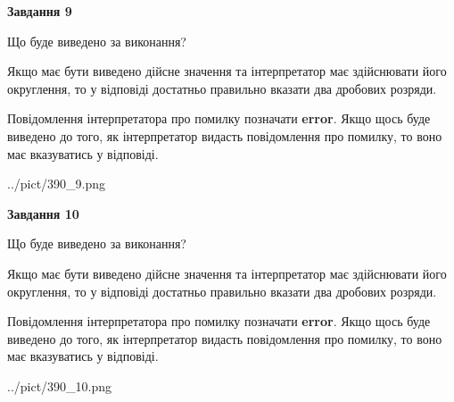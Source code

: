 \documentclass[12pt, ukrainian]{article}
\begin{document}
{\begin {Large}
{\begin {center}\textbf{Завдання 9}\end {center}}\par
Що буде виведено за виконання? \par

Якщо має бути виведено дійсне значення та інтерпретатор має здійснювати його округлення, 
то у відповіді достатньо правильно вказати два дробових розряди.

Повідомлення інтерпретатора про помилку позначати \textbf{error}.
Якщо щось буде виведено до того, як інтерпретатор видасть повідомлення про помилку, 
то воно має вказуватись у відповіді. \par

\begin{center}
	{../pict/390_9.png}
\end{center}
\newpage

{\begin {center}\textbf{Завдання 10}\end {center}}\par
Що буде виведено за виконання? \par

Якщо має бути виведено дійсне значення та інтерпретатор має здійснювати його округлення, 
то у відповіді достатньо правильно вказати два дробових розряди.

Повідомлення інтерпретатора про помилку позначати \textbf{error}.
Якщо щось буде виведено до того, як інтерпретатор видасть повідомлення про помилку, 
то воно має вказуватись у відповіді. \par

\begin{center}
	{../pict/390_10.png}
\end{center}
\newpage

\end {Large}}
\end{document}
